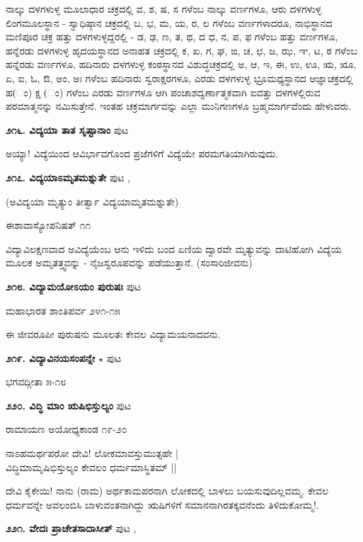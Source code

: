 {ನಾಲ್ಕು ದಳಗಳುಳ್ಳ ಮೂಲಾಧಾರ ಚಕ್ರದಲ್ಲಿ ವ, ಶ, ಷ, ಸ ಗಳೆಂಬ ನಾಲ್ಕು ವರ್ಣಗಳೂ,  ಆರು ದಳಗಳುಳ್ಳ ಲಿಂಗಮೂಲಸ್ಥಾನ - ಸ್ವಾಧಿಷ್ಠಾನ ಚಕ್ರದಲ್ಲಿ ಬ, ಭ, ಮ, ಯ, ರ, ಲ ಗಳೆಂಬ ವರ್ಣಗಳಾದರೂ, ನಾಭಿಸ್ಥಾನದ ಮಣಿಪೂರ ಚಕ್ರ ಹತ್ತು ದಳಗಳುಳ್ಳದ್ದರಲ್ಲಿ - ಡ, ಢ, ಣ, ತ, ಥ, ದ ಧ, ನ, ಪ, ಫ ಗಳೆಂಬ ಹತ್ತು ವರ್ಣಗಳೂ, ಹನ್ನೆರಡು ದಳಗಳುಳ್ಳ ಹೃದಯಸ್ಥಾನದ ಅನಾಹತ ಚಕ್ರದಲ್ಲಿ ಕ, ಖ, ಗ, ಘ, ಙ, ಚ, ಛ, ಜ, ಝ, ಞ, ಟ, ಠ ಗಳೆಂಬ ಹನ್ನೆರಡು ವರ್ಣಗಳೂ, ಹದಿನಾರು ದಳಗಳುಳ್ಳ ಕಂಠಸ್ಥಾನದ ವಿಶುದ್ಧಚಕ್ರದಲ್ಲಿ ಅ, ಆ, ಇ, ಈ, ಉ, ಊ, ಋ, ೠ, ಏ, ಐ, ಓ, ಔ, ಅಂ, ಅಃ ಗಳೆಂಬ ಹದಿನಾರು ಸ್ವರಾಕ್ಷರಗಳೂ, ಎರಡು ದಳಗಳುಳ್ಳ ಭ್ರೂಮಧ್ಯಸ್ಥಾನದ ಆಜ್ಞಾಚಕ್ರದಲ್ಲಿ ಹ(ಂ) ಕ್ಷ (ಂ) ಗಳೆಂಬ ಎರಡು ವರ್ಣಗಳೂ ಆಗಿ ಪಂಚಾಶದ್ವರ್ಣಾತ್ಮಕವಾಗಿ ಐವತ್ತು ದಳಗಳಲ್ಲಿರುವ ಪರಮಾತ್ಮನನ್ನು ನಮಿಸುತ್ತೇನೆ. ಇಂತಹ ಚಕ್ರಮಾರ್ಗವನ್ನು ಎಲ್ಲಾ ಮುನಿಗಣಗಳೂ ಬ್ರಹ್ಮಮಾರ್ಗವೆಂದು ಹೇಳುವರು.

\medskip
\noindent\textbf{೨೧೬. ವಿದ್ಯಯಾ ತಾತ ಸೃಷ್ಟಾನಾಂ} \hfill ಪುಟ \pageref{133}

ಅಯ್ಯಾ! ವಿದ್ಯೆಯಿಂದ ಆವಿರ್ಭಾವಗೊಂದ ಪ್ರಜೆಗಳಿಗೆ ವಿದ್ಯೆಯೇ ಪರಮಗತಿಯಾಗಿರುವುದು.

\medskip
\noindent\textbf{೨೧೭. ವಿದ್ಯಯಾಽಮೃತಮಶ್ನುತೇ} \hfill ಪುಟ \pageref{99},\pageref{133a}

(ಅವಿದ್ಯಯಾ ಮೃತ್ಯುಂ ತೀರ್ತ್ವಾ ವಿದ್ಯಯಾಮೃತಮಶ್ನುತೇ)

\hfill ಈಶಾವಾಸ್ಯೋಪನಿಷತ್ ೧೧

ವಿದ್ಯಾವಿಲಕ್ಷಣವಾದ ಅವಿದ್ಯೆಯೆಂಬ ಆನು ಇಳಿದು ಬಂದ ಏಣಿಯ ದ್ವಾರವೇ ಮೃತ್ಯುವನ್ನು ದಾಟಿಹೋಗಿ ವಿದ್ಯೆಯ ಮೂಲಕ ಅಮೃತತ್ತ್ವವನ್ನು - ನೈಜಸ್ವರೂಪವನ್ನು ಪಡೆಯುತ್ತಾನೆ. (ಸಂಸಾರಿಜೀವನು)

\medskip
\noindent\textbf{೨೧೮. ವಿದ್ಯಾಮಯೋಽಯಂ ಪುರುಷಃ} \hfill ಪುಟ \pageref{133b}

\hfill ಮಹಾಭಾರತ ಶಾಂತಿಪರ್ವ ೨೪೧-೧೫

ಈ ಜೀವರೂಪೀ ಪುರುಷನು ಮೂಲತಃ ಕೇವಲ ವಿದ್ಯಾಮಯನಾದವನು.

\medskip
\noindent\textbf{೨೧೯. ವಿದ್ಯಾವಿನಯಸಂಪನ್ನೇ} $\star$ \hfill ಪುಟ \pageref{67}

\hfill ಭಗವದ್ಗೀತಾ ೫-೧೮

\medskip
\noindent\textbf{೨೨೦. ವಿದ್ಧಿ ಮಾಂ ಋಷಿಭಿಸ್ತುಲ್ಯಂ} \hfill ಪುಟ \pageref{151b}

\hfill ರಾಮಾಯಣ ಅಯೋಧ್ಯಕಾಂಡ ೧೯-೨೦

\begin{shloka}
ನಾಽಹಮರ್ಥಪರೋ ದೇವಿ! ಲೋಕಮಾವಸ್ತುಮುತ್ಸಹೇ |\\
ವಿದ್ಧಿಮಾಮೃಷಿಭಿಸ್ತುಲ್ಯಂ ಕೇವಲಂ ಧರ್ಮಮಾಸ್ಥಿತಮ್ ||
\end{shloka}

ದೇವಿ ಕೈಕೇಯಿ! ನಾನು (ರಾಮ) ಅರ್ಥಕಾಮಪರನಾಗಿ ಲೋಕದಲ್ಲಿ ಬಾಳಲು ಬಯಸುವುದಿಲ್ಲವಮ್ಮ. ಕೇವಲ ಧರ್ಮವನ್ನೇ ಅವಲಂಬಿಸಿ ಬಾಳುವಂತನಾಗಿದ್ದು ಋಷಿಗಳಿಗೆ ಸಮಾನನಾಗಿರತಕ್ಕವನೆಂದು ತಿಳಿದುಕೋಮ್ಮ!.

\medskip
\noindent\textbf{೨೨೧. ವೇದಃ ಪ್ರಾಚೇತಸಾದಾಸೀತ್} \hfill ಪುಟ \pageref{228},\pageref{232c}

}
